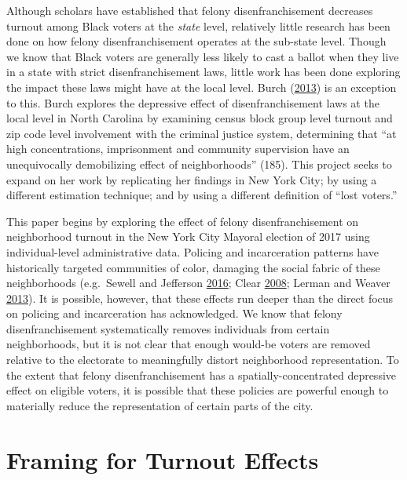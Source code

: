 \documentclass[12pt,]{article}
\begin{document}
Although scholars have established that felony disenfranchisement decreases turnout among Black voters at the \emph{state} level, relatively little research has been done on how felony disenfranchisement operates at the sub-state level. Though we know that Black voters are generally less likely to cast a ballot when they live in a state with strict disenfranchisement laws, little work has been done exploring the impact these laws might have at the local level. Burch (\protect\hyperlink{ref-Burch2013}{2013}) is an exception to this. Burch explores the depressive effect of disenfranchisement laws at the local level in North Carolina by examining census block group level turnout and zip code level involvement with the criminal justice system, determining that ``at high concentrations, imprisonment and community supervision have an unequivocally demobilizing effect of neighborhoods'' (185). This project seeks to expand on her work by replicating her findings in New York City; by using a different estimation technique; and by using a different definition of ``lost voters.''

This paper begins by exploring the effect of felony disenfranchisement on neighborhood turnout in the New York City Mayoral election of 2017 using individual-level administrative data. Policing and incarceration patterns have historically targeted communities of color, damaging the social fabric of these neighborhoods (e.g.~Sewell and Jefferson \protect\hyperlink{ref-Sewell2016}{2016}; Clear \protect\hyperlink{ref-Clear2008}{2008}; Lerman and Weaver \protect\hyperlink{ref-Lerman2013}{2013}). It is possible, however, that these effects run deeper than the direct focus on policing and incarceration has acknowledged. We know that felony disenfranchisement systematically removes individuals from certain neighborhoods, but it is not clear that enough would-be voters are removed relative to the electorate to meaningfully distort neighborhood representation. To the extent that felony disenfranchisement has a spatially-concentrated depressive effect on eligible voters, it is possible that these policies are powerful enough to materially reduce the representation of certain parts of the city.

\hypertarget{framing-for-turnout-effects}{%
\section*{Framing for Turnout Effects}\label{framing-for-turnout-effects}}
\end{document}
